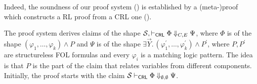 Indeed, the soundness of our proof system ()
is established by a (meta-)proof which constructs a RL proof from a CRL one ().

The proof system derives claims of the shape
$\mathcal{S}, \vdash_{\mathsf{CRL}} \Phi \Downarrow_{C,E} \Psi$,
where $\Phi$ is of the shape
$(\varphi_1, \ldots, \varphi_k) \land P$
and $\Psi$ is of the shape
$\exists \vec{Y}.\, (\varphi^\prime_1, \ldots, \varphi^\prime_k) \land P^\prime$,
where $P,P^\prime$ are structureless FOL formulas
and every $\varphi_i$ is a matching logic pattern.
The idea is that $P$ is the part of the claim that relates variables from different components.
Initially, the proof starts with the claim
$\mathcal{S} \vdash_{\mathsf{CRL}} \Phi \Downarrow_{\emptyset, \emptyset} \Psi$.


